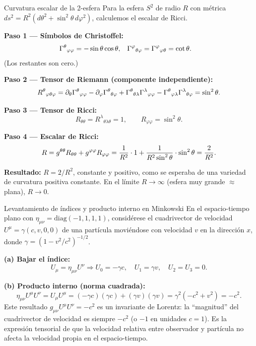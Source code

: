 \begin{ejemplo}{Curvatura escalar de la 2-esfera}{}
Para la esfera $S^2$ de radio $R$ con métrica $ds^2 = R^2(d\theta^2 + \sin^2\theta\, d\varphi^2)$, calculemos el escalar de Ricci.

\textbf{Paso 1 — Símbolos de Christoffel:}
\begin{align*}
  \Gamma^{\theta}{}_{\varphi \varphi} &= -\sin\theta\cos\theta, &
  \Gamma^{\varphi}{}_{\theta \varphi} &= \Gamma^{\varphi}{}_{\varphi \theta} = \cot\theta.
\end{align*}
(Los restantes son cero.)

\textbf{Paso 2 — Tensor de Riemann (componente independiente):}
\[
  R^\theta{}_{\varphi\theta\varphi}
  = \partial_\theta \Gamma^{\theta}{}_{\varphi \varphi}
  - \partial_\varphi \Gamma^{\theta}{}_{\theta \varphi}
  + \Gamma^{\theta}{}_{\theta \lambda}\Gamma^{\lambda}{}_{\varphi \varphi}
  - \Gamma^{\theta}{}_{\varphi \lambda}\Gamma^{\lambda}{}_{\theta \varphi}
  = \sin^2\theta.
\]

\textbf{Paso 3 — Tensor de Ricci:}
\[
  R_{\theta\theta} = R^\lambda{}_{\theta\lambda\theta} = 1, \qquad
  R_{\varphi\varphi} = \sin^2\theta.
\]

\textbf{Paso 4 — Escalar de Ricci:}
\[
  R = g^{\theta\theta} R_{\theta\theta} + g^{\varphi\varphi} R_{\varphi\varphi}
  = \frac{1}{R^2}\cdot 1 + \frac{1}{R^2\sin^2\theta}\cdot\sin^2\theta
  = \frac{2}{R^2}.
\]

\textbf{Resultado:} $R = 2/R^2$, constante y positivo, como se esperaba de una variedad de curvatura positiva constante. En el límite $R \to \infty$ (esfera muy grande $\approx$ plana), $R \to 0$.
\end{ejemplo}

\begin{ejemplo}{Levantamiento de índices y producto interno en Minkowski}{}
En el espacio-tiempo plano con $\eta_{\mu\nu} = \mathrm{diag}(-1,1,1,1)$, considérese el cuadrivector de velocidad $U^\mu = \gamma(c, v, 0, 0)$ de una partícula moviéndose con velocidad $v$ en la dirección $x$, donde $\gamma = (1-v^2/c^2)^{-1/2}$.

\textbf{(a) Bajar el índice:}
\[
  U_\mu = \eta_{\mu\nu} U^\nu \Rightarrow
  U_0 = -\gamma c, \quad U_1 = \gamma v, \quad U_2 = U_3 = 0.
\]

\textbf{(b) Producto interno (norma cuadrada):}
\[
  \eta_{\mu\nu} U^\mu U^\nu = U_\mu U^\mu = (-\gamma c)(\gamma c) + (\gamma v)(\gamma v)
  = \gamma^2(-c^2 + v^2) = -c^2.
\]
Este resultado $g_{\mu\nu}U^\mu U^\nu = -c^2$ es un invariante de Lorentz: la ``magnitud'' del cuadrivector de velocidad es siempre $-c^2$ (o $-1$ en unidades $c=1$). Es la expresión tensorial de que la velocidad relativa entre observador y partícula no afecta la velocidad propia en el espacio-tiempo.
\end{ejemplo}

